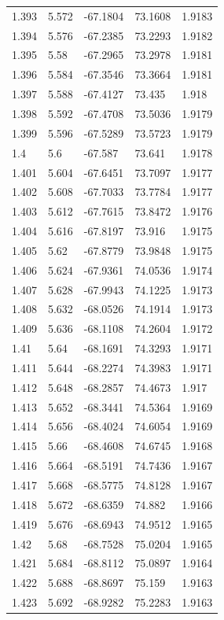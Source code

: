 \begin{tabular}{lllll}
1.393 & 5.572 & -67.1804 & 73.1608 & 1.9183 \\
1.394 & 5.576 & -67.2385 & 73.2293 & 1.9182 \\
1.395 & 5.58 & -67.2965 & 73.2978 & 1.9181 \\
1.396 & 5.584 & -67.3546 & 73.3664 & 1.9181 \\
1.397 & 5.588 & -67.4127 & 73.435 & 1.918 \\
1.398 & 5.592 & -67.4708 & 73.5036 & 1.9179 \\
1.399 & 5.596 & -67.5289 & 73.5723 & 1.9179 \\
1.4 & 5.6 & -67.587 & 73.641 & 1.9178 \\
1.401 & 5.604 & -67.6451 & 73.7097 & 1.9177 \\
1.402 & 5.608 & -67.7033 & 73.7784 & 1.9177 \\
1.403 & 5.612 & -67.7615 & 73.8472 & 1.9176 \\
1.404 & 5.616 & -67.8197 & 73.916 & 1.9175 \\
1.405 & 5.62 & -67.8779 & 73.9848 & 1.9175 \\
1.406 & 5.624 & -67.9361 & 74.0536 & 1.9174 \\
1.407 & 5.628 & -67.9943 & 74.1225 & 1.9173 \\
1.408 & 5.632 & -68.0526 & 74.1914 & 1.9173 \\
1.409 & 5.636 & -68.1108 & 74.2604 & 1.9172 \\
1.41 & 5.64 & -68.1691 & 74.3293 & 1.9171 \\
1.411 & 5.644 & -68.2274 & 74.3983 & 1.9171 \\
1.412 & 5.648 & -68.2857 & 74.4673 & 1.917 \\
1.413 & 5.652 & -68.3441 & 74.5364 & 1.9169 \\
1.414 & 5.656 & -68.4024 & 74.6054 & 1.9169 \\
1.415 & 5.66 & -68.4608 & 74.6745 & 1.9168 \\
1.416 & 5.664 & -68.5191 & 74.7436 & 1.9167 \\
1.417 & 5.668 & -68.5775 & 74.8128 & 1.9167 \\
1.418 & 5.672 & -68.6359 & 74.882 & 1.9166 \\
1.419 & 5.676 & -68.6943 & 74.9512 & 1.9165 \\
1.42 & 5.68 & -68.7528 & 75.0204 & 1.9165 \\
1.421 & 5.684 & -68.8112 & 75.0897 & 1.9164 \\
1.422 & 5.688 & -68.8697 & 75.159 & 1.9163 \\
1.423 & 5.692 & -68.9282 & 75.2283 & 1.9163 \\

\end{tabular}
